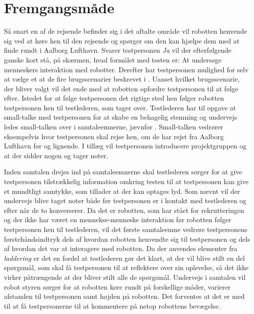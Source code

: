 \section{Fremgangsmåde}
\label{ParametreFremgangsmaade}
%
Så snart en af de rejsende befinder sig i det aftalte område vil robotten henvende sig ved at køre hen til den rejsende og spørger om den kan hjælpe dem med at finde rundt i Aalborg Lufthavn. Svarer testpersonen \textit{Ja} vil der efterfølgende ganske kort stå, på skærmen, hvad formålet med testen er: At undersøge menneskers interaktion med robotter. Derefter har testpersonen mulighed for selv at vælge et at de fire brugsscenarier beskrevet i . Uanset hvilket brugsscenarie, der bliver valgt vil det ende med at robotten opfordre testpersonen til at følge efter. Istedet for at følge testpersonen det rigtige sted hen følger robotten testpersonen hen til testlederen, som tager over. Testlederen har til opgave at small-talke med testpersonen for at skabe en behagelig stemning og undervejs ledes small-talken over i samtaleemnerne, jævnfør . Small-talken vedrører eksempelvis hvor testpersonen skal rejse hen, om de har rejst fra Aalborg Lufthavn før og lignende. I tillæg vil testpersonen introducere projektgruppen og at der sidder nogen og tager noter. 

Inden samtalen drejes ind på samtaleemnerne skal testlederen sørger for at give testpersonen tilstrækkelig information omkring testen til at testpersonen kan give et mundtligt samtykke, som tillader at der kan optages lyd. Som nævnt vil der undervejs blive taget noter både før testpersonen er i kontakt med testlederen og efter når de to konverserer. \blankline
%
Da det er robotten, som har stået for rekrutteringen og der ikke har været en mennekse-menneske interaktion før robotten følger testpersonen hen til testlederen, vil det første samtaleemne vedrøre testpersonens førstehåndsindtryk dels af hvordan robotten henvendte sig til testpersonen og dels af hvordan det var at interagere med robotten. Da der anvendes elementer fra \textit{laddering} er det en fordel at testlederen gør det klart, at der vil blive stilt en del spørgsmål, som skal få testpersonen til at reflektere over sin oplevelse, så det ikke virker påtrængende at der bliver stilt alle de spørgsmål. Undervejs i samtalen vil robot styren sørger for at robotten køre rundt på forskellige måder, varierer afstanden til testpersonen samt højden på robotten. Det forventes at det er med til at få testpersonerne til at kommentere på netop robottens bevægelse. 


